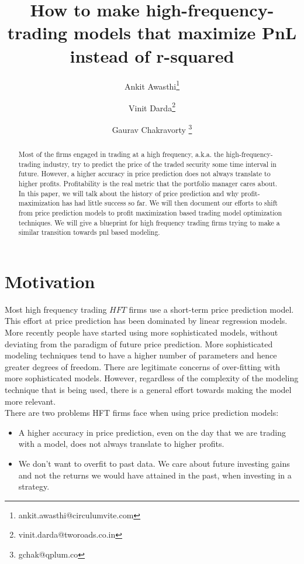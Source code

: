 \documentclass[a4paper]{article}
\author[1]{Ankit Awasthi\thanks{ankit.awasthi@circulumvite.com}}
\author[1]{Vinit Darda\thanks{vinit.darda@tworoads.co.in}}
\author[1]{Gaurav Chakravorty \thanks{gchak@qplum.co}}
\affil[1]{qplum Investment Research}
\title{How to make high-frequency-trading models that maximize PnL instead of r-squared}
\date{}
\begin{document}
\maketitle

\begin{abstract}
Most of the firms engaged in trading at a high frequency, a.k.a. the high-frequency-trading industry, try to predict the price of the traded security some time interval in future. However, a higher accuracy in price prediction does not always translate to higher profits. Profitability is the real metric that the portfolio manager cares about. In this paper, we will talk about the history of price prediction and why profit-maximization has had little success so far. We will then document our efforts to shift from price prediction models to profit maximization based trading model optimization techniques. We will give a blueprint for high frequency trading firms trying to make a similar transition towards pnl based modeling.
\end{abstract}


\section{Motivation}
Most high frequency trading \(HFT\) firms use a short-term price prediction model. This effort at price prediction has been dominated by linear regression models. More recently people have started using more sophisticated models, without deviating from the paradigm of future price prediction. More sophisticated modeling techniques tend to have a higher number of parameters and hence greater degrees of freedom. There are legitimate concerns of over-fitting with more sophisticated models. However, regardless of the complexity of the modeling technique that is being used, there is a general effort towards making the model more relevant.\\
There are two problems HFT firms face when using price prediction models: 
\begin{itemize}
	\item A higher accuracy in price prediction, even on the day that we are trading with a model, does not always translate to higher profits.
	\item We don't want to overfit to past data. We care about future investing gains and not the returns we would have attained in the past, when investing in a strategy. \cite{Saruchi2016}
\end{itemize}
\end{document}
